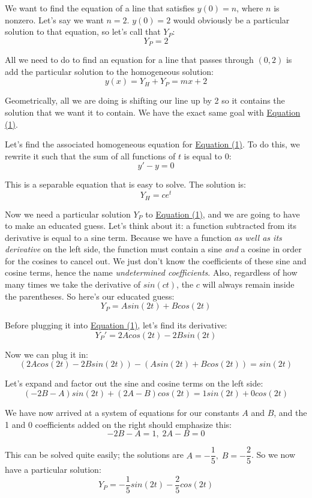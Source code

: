 We want to find the equation of a line that satisfies $y(0) = n$, where $n$ is nonzero. Let's say we want $n = 2$. $y(0) = 2$ would obviously be a particular solution to that equation, so let's call that $Y_{P}$:
$$Y_{P} = 2$$

All we need to do to find an equation for a line that passes through $(0, 2)$ is add the particular solution to the homogeneous solution:
$$y(x) = Y_{H} + Y_{P} = mx + 2$$

Geometrically, all we are doing is shifting our line up by 2 so it contains the solution that we want it to contain. We have the exact same goal with \hyperref[uceq1]{Equation (1)}.

Let's find the associated homogeneous equation for \hyperref[uceq1]{Equation (1)}. To do this, we rewrite it such that the sum of all functions of $t$ is equal to 0:
$$y' - y = 0$$

This is a separable equation that is easy to solve. The solution is:
$$Y_{H} = ce^{t}$$

Now we need a particular solution $Y_{P}$ to \hyperref[uceq1]{Equation (1)}, and we are going to have to make an educated guess. Let's think about it: a function subtracted from its derivative is equal to a sine term. Because we have a function \textit{as well as its derivative} on the left side, the function must contain a sine \textit{and} a cosine in order for the cosines to cancel out. We just don't know the coefficients of these sine and cosine terms, hence the name \textit{undetermined coefficients}. Also, regardless of how many times we take the derivative of $sin(ct)$, the $c$ will always remain inside the parentheses. So here's our educated guess:
$$Y_{P} = Asin(2t) + Bcos(2t)$$

Before plugging it into \hyperref[uceq1]{Equation (1)}, let's find its derivative:
$$Y_{P}' = 2Acos(2t) - 2Bsin(2t)$$

Now we can plug it in:
$$(2Acos(2t) - 2Bsin(2t)) - (Asin(2t) + Bcos(2t)) = sin(2t)$$

Let's expand and factor out the sine and cosine terms on the left side:
$$(-2B - A)sin(2t) + (2A - B)cos(2t) = 1sin(2t) + 0cos(2t)$$

We have now arrived at a system of equations for our constants $A$ and $B$, and the 1 and 0 coefficients added on the right should emphasize this:
$$-2B - A = 1,\; 2A - B = 0$$

This can be solved quite easily; the solutions are $A = -\dfrac{1}{5},\; B = -\dfrac{2}{5}$. So we now have a particular solution:
$$Y_{P} = -\frac{1}{5}sin(2t) -\frac{2}{5}cos(2t)$$

